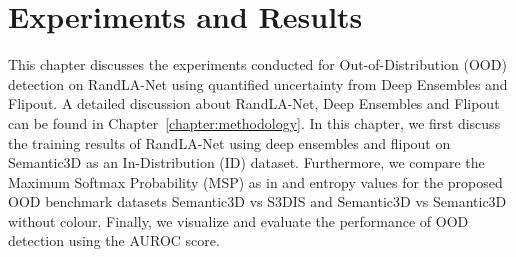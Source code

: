 

    \chapter{Experiments and Results}
    This chapter discusses the experiments conducted for Out-of-Distribution (OOD) detection on RandLA-Net using quantified uncertainty from Deep Ensembles and Flipout.
    A detailed discussion about RandLA-Net, Deep Ensembles and Flipout can be found in Chapter~\ref{chapter:methodology}. In this chapter, we first discuss the training results of RandLA-Net using deep ensembles and flipout on Semantic3D as an In-Distribution (ID) dataset.
    Furthermore, we compare the Maximum Softmax Probability (MSP) as in \cite{hendrycks2016baseline_MSP} and entropy values for the proposed OOD benchmark datasets Semantic3D vs S3DIS and Semantic3D vs Semantic3D without colour.
    Finally, we visualize and evaluate the performance of OOD detection using the AUROC score.

